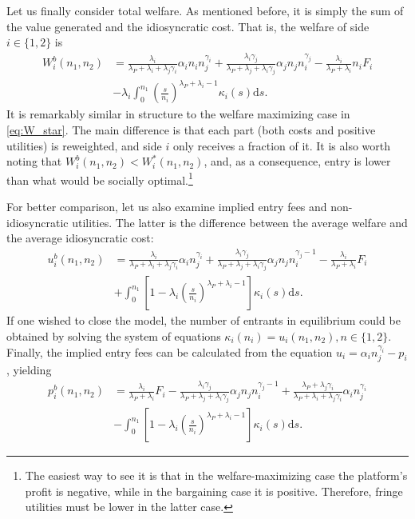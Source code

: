 \documentclass[a4paper]{article}
\newcommand{\ds}{\mathrm{d}s}
\begin{document}
Let us finally consider total welfare.
As mentioned before, it is simply the sum of the value generated and the idiosyncratic cost.
That is, the welfare of side $i \in \{1, 2\}$ is
\begin{align*}
    W_i^b(n_1, n_2) &= \frac{\lambda_i}{\lambda_P + \lambda_i + \lambda_j\gamma_i} \alpha_i n_i n_j^{\gamma_i} + \frac{\lambda_i \gamma_j}{\lambda_P + \lambda_j + \lambda_i\gamma_j} \alpha_j n_j n_i^{\gamma_j} - \frac{\lambda_i}{\lambda_P + \lambda_i} n_i F_i \\
    &- \lambda_i \int_0^{n_1} \left( \frac{s}{n_i} \right)^{\lambda_P + \lambda_i - 1} \kappa_i(s) \ds.
\end{align*}
It is remarkably similar in structure to the welfare maximizing case in \cref{eq:W_star}.
The main difference is that each part (both costs and positive utilities) is reweighted, and side $i$ only receives a fraction of it.
It is also worth noting that $W_i^b(n_1, n_2) < W_i^*(n_1, n_2)$, and, as a consequence, entry is lower than what would be socially optimal.\footnote{
    The easiest way to see it is that in the welfare-maximizing case the platform's profit is negative, while in the bargaining case it is positive.
    Therefore, fringe utilities must be lower in the latter case.
}

For better comparison, let us also examine implied entry fees and non-idiosyncratic utilities.
The latter is the difference between the average welfare and the average idiosyncratic cost:
\begin{align*}
    u_i^b(n_1, n_2) &= \frac{\lambda_i}{\lambda_P + \lambda_i + \lambda_j\gamma_i} \alpha_i n_j^{\gamma_i} + \frac{\lambda_i \gamma_j}{\lambda_P + \lambda_j + \lambda_i\gamma_j} \alpha_j n_j n_i^{\gamma_j - 1} - \frac{\lambda_i}{\lambda_P + \lambda_i} F_i \\
    &+ \int_0^{n_1} \left[ 1 - \lambda_i \left( \frac{s}{n_i} \right)^{\lambda_P + \lambda_i - 1} \right] \kappa_i(s) \ds.
\end{align*}
If one wished to close the model, the number of entrants in equilibrium could be obtained by solving the system of equations $\kappa_i(n_i) = u_i(n_1, n_2), n \in \{1, 2\}$.
Finally, the implied entry fees can be calculated from the equation $u_i = \alpha_i n_j^{\gamma_i} - p_i$, yielding
\begin{align*}
    p_i^b(n_1, n_2) &= \frac{\lambda_i}{\lambda_P + \lambda_i} F_i - \frac{\lambda_i \gamma_j}{\lambda_P + \lambda_j + \lambda_i\gamma_j} \alpha_j n_j n_i^{\gamma_j - 1} + \frac{\lambda_P + \lambda_j\gamma_i}{\lambda_P + \lambda_i + \lambda_j\gamma_i} \alpha_i n_j^{\gamma_i} \\
    &- \int_0^{n_1} \left[ 1 - \lambda_i \left( \frac{s}{n_i} \right)^{\lambda_P + \lambda_i - 1} \right] \kappa_i(s) \ds.
\end{align*}
\end{document}
